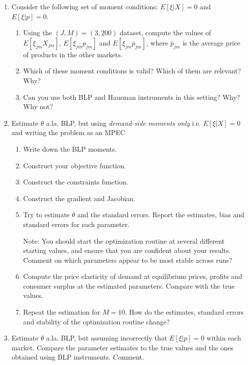 \documentclass[12pt ]{article}
\begin{document}
\begin{enumerate}[1.]
\item Consider the following set of moment conditions: $E[\xi|X]=0$ and
  $E[\xi|p]=0$.
  \begin{enumerate}
  \item Using the $(J,M)=(3,200)$ dataset, compute the values of
    $E[\xi_{jm}X_{jm}]$, $E[\xi_{jm}p_{jm}]$ and
    $E[\xi_{jm}\bar{p}_{jm}]$, where $\bar{p}_{jm}$ is the average
    price of products in the other markets.
  \item Which of these moment conditions is valid? Which of them are relevant?
    Why?
  \item Can you use both BLP and Hausman instruments in this
    setting? Why? Why not?
  \end{enumerate}
\item Estimate $\theta$ a.la. BLP, but using \emph{demand-side
    moments only} i.e. $E[\xi|X]=0$ and writing the problem as an MPEC
  \begin{enumerate}
  \item Write down the BLP moments.
  \item Construct your objective function.
  \item Construct the constraints function.
  \item Construct the gradient and Jacobian.
  \item Try to estimate $\theta$ and the standard errors. Report the
    estimates, bias and standard errors for each parameter.

    Note: You should start the optimization routine at several
    different starting values, and ensure that you are confident about
    your results. Comment on which parameters appear to be most stable across
    runs?
      
  \item Compute the price elasticity of demand at equilibrium prices,
    profits and consumer surplus at the estimated parameters. Compare
    with the true values.
  \item Repeat the estimation for $M=10$. How do the estimates,
    standard errors and stability of the optimization routine change?
  \end{enumerate}
\item Estimate $\theta$ a.la. BLP, but assuming incorrectly that $E[\xi|p]=0$
  within each market. Compare the parameter estimates to the true
  values and the ones obtained using BLP instruments. Comment.
\end{enumerate}
\end{document}
